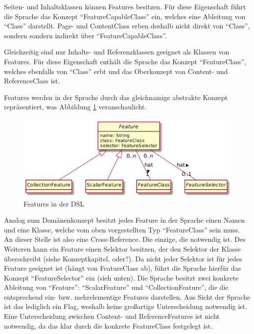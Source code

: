     Seiten- und Inhaltsklassen können Features besitzen.
    Für diese Eigenschaft führt die Sprache das Konzept "`FeatureCapableClass"' ein,
    welches eine Ableitung von "`Class"' darstellt.
    Page- und ContentClass erben deshalb nicht direkt von "`Class"',
    sondern sondern indirekt über "`FeatureCapableClass"'.

    Gleichzeitig sind nur Inhalts- und Referenzklassen geeignet als Klassen
    von Features. Für diese Eigenschaft enthält die Sprache das Konzept "`FeatureClass"',
    welches ebenfalls von "`Class"' erbt und das Oberkonzept von Content- und ReferenceClass ist.

    Features werden in der Sprache durch das gleichnamige abstrakte Konzept repräsentiert,
    was Abbildung \ref{image:dslFeatures} veranschaulicht.

    \begin{figure}[htb]
        \centering
        \includegraphics[width=\textwidth]{../resources/dsl/features.png}
        \caption{Features in der DSL}
        \label{image:dslFeatures}
    \end{figure}

    Analog zum Domänenkonzept besitzt jedes Feature in der Sprache einen Namen
    und eine Klasse, welche vom oben vorgestellten Typ "`FeatureClass"' sein muss.
    An dieser Stelle ist also eine Cross-Reference. Die einzige, die notwendig ist.
    Des Weiteren kann ein Feature einen Selektor besitzen, der den Selektor der
    Klasse überschreibt (siehe Konzeptkapitel, oder?).
    Da nicht jeder Selektor ist für jedes Feature geeignet ist (hängt von FeatureClass ab),
    führt die Sprache hierfür das Konzept "`FeatureSelector"' ein (sieh unten).
    Die Sprache besitzt zwei konkrete Ableitung von "`Feature"':
    "`ScalarFeature"' und "`CollectionFeature"', die die entsprechend ein- bzw. mehrelementige Features darstellen.
    Aus Sicht der Sprache ist das lediglich ein Flag, weshalb keine großartige Unterscheidung notwendig ist.
    Eine Unterscheidung zwischen Content- und ReferenceFeatures ist nicht notwendig,
    da das klar durch die konkrete FeatureClass festgelegt ist.

